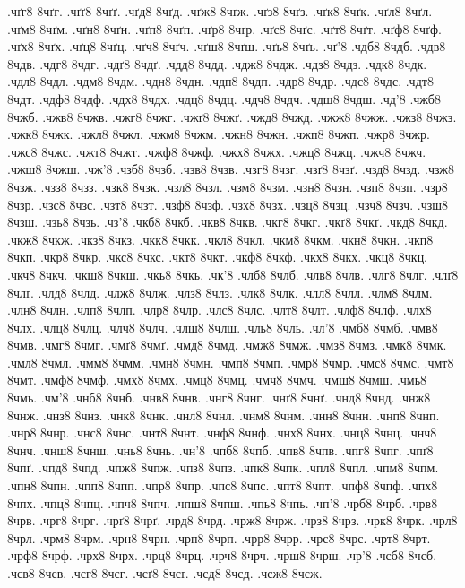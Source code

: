 {.чґг8 8чґг.
.чґґ8 8чґґ.
.чґд8 8чґд.
.чґж8 8чґж.
.чґз8 8чґз.
.чґк8 8чґк.
.чґл8 8чґл.
.чґм8 8чґм.
.чґн8 8чґн.
.чґп8 8чґп.
.чґр8 8чґр.
.чґс8 8чґс.
.чґт8 8чґт.
.чґф8 8чґф.
.чґх8 8чґх.
.чґц8 8чґц.
.чґч8 8чґч.
.чґш8 8чґш.
.чґь8 8чґь.
.чґ'8
.чдб8 8чдб.
.чдв8 8чдв.
.чдг8 8чдг.
.чдґ8 8чдґ.
.чдд8 8чдд.
.чдж8 8чдж.
.чдз8 8чдз.
.чдк8 8чдк.
.чдл8 8чдл.
.чдм8 8чдм.
.чдн8 8чдн.
.чдп8 8чдп.
.чдр8 8чдр.
.чдс8 8чдс.
.чдт8 8чдт.
.чдф8 8чдф.
.чдх8 8чдх.
.чдц8 8чдц.
.чдч8 8чдч.
.чдш8 8чдш.
.чд'8
.чжб8 8чжб.
.чжв8 8чжв.
.чжг8 8чжг.
.чжґ8 8чжґ.
.чжд8 8чжд.
.чжж8 8чжж.
.чжз8 8чжз.
.чжк8 8чжк.
.чжл8 8чжл.
.чжм8 8чжм.
.чжн8 8чжн.
.чжп8 8чжп.
.чжр8 8чжр.
.чжс8 8чжс.
.чжт8 8чжт.
.чжф8 8чжф.
.чжх8 8чжх.
.чжц8 8чжц.
.чжч8 8чжч.
.чжш8 8чжш.
.чж'8
.чзб8 8чзб.
.чзв8 8чзв.
.чзг8 8чзг.
.чзґ8 8чзґ.
.чзд8 8чзд.
.чзж8 8чзж.
.чзз8 8чзз.
.чзк8 8чзк.
.чзл8 8чзл.
.чзм8 8чзм.
.чзн8 8чзн.
.чзп8 8чзп.
.чзр8 8чзр.
.чзс8 8чзс.
.чзт8 8чзт.
.чзф8 8чзф.
.чзх8 8чзх.
.чзц8 8чзц.
.чзч8 8чзч.
.чзш8 8чзш.
.чзь8 8чзь.
.чз'8
.чкб8 8чкб.
.чкв8 8чкв.
.чкг8 8чкг.
.чкґ8 8чкґ.
.чкд8 8чкд.
.чкж8 8чкж.
.чкз8 8чкз.
.чкк8 8чкк.
.чкл8 8чкл.
.чкм8 8чкм.
.чкн8 8чкн.
.чкп8 8чкп.
.чкр8 8чкр.
.чкс8 8чкс.
.чкт8 8чкт.
.чкф8 8чкф.
.чкх8 8чкх.
.чкц8 8чкц.
.чкч8 8чкч.
.чкш8 8чкш.
.чкь8 8чкь.
.чк'8
.члб8 8члб.
.члв8 8члв.
.члг8 8члг.
.члґ8 8члґ.
.члд8 8члд.
.члж8 8члж.
.члз8 8члз.
.члк8 8члк.
.члл8 8члл.
.члм8 8члм.
.члн8 8члн.
.члп8 8члп.
.члр8 8члр.
.члс8 8члс.
.члт8 8члт.
.члф8 8члф.
.члх8 8члх.
.члц8 8члц.
.члч8 8члч.
.члш8 8члш.
.чль8 8чль.
.чл'8
.чмб8 8чмб.
.чмв8 8чмв.
.чмг8 8чмг.
.чмґ8 8чмґ.
.чмд8 8чмд.
.чмж8 8чмж.
.чмз8 8чмз.
.чмк8 8чмк.
.чмл8 8чмл.
.чмм8 8чмм.
.чмн8 8чмн.
.чмп8 8чмп.
.чмр8 8чмр.
.чмс8 8чмс.
.чмт8 8чмт.
.чмф8 8чмф.
.чмх8 8чмх.
.чмц8 8чмц.
.чмч8 8чмч.
.чмш8 8чмш.
.чмь8 8чмь.
.чм'8
.чнб8 8чнб.
.чнв8 8чнв.
.чнг8 8чнг.
.чнґ8 8чнґ.
.чнд8 8чнд.
.чнж8 8чнж.
.чнз8 8чнз.
.чнк8 8чнк.
.чнл8 8чнл.
.чнм8 8чнм.
.чнн8 8чнн.
.чнп8 8чнп.
.чнр8 8чнр.
.чнс8 8чнс.
.чнт8 8чнт.
.чнф8 8чнф.
.чнх8 8чнх.
.чнц8 8чнц.
.чнч8 8чнч.
.чнш8 8чнш.
.чнь8 8чнь.
.чн'8
.чпб8 8чпб.
.чпв8 8чпв.
.чпг8 8чпг.
.чпґ8 8чпґ.
.чпд8 8чпд.
.чпж8 8чпж.
.чпз8 8чпз.
.чпк8 8чпк.
.чпл8 8чпл.
.чпм8 8чпм.
.чпн8 8чпн.
.чпп8 8чпп.
.чпр8 8чпр.
.чпс8 8чпс.
.чпт8 8чпт.
.чпф8 8чпф.
.чпх8 8чпх.
.чпц8 8чпц.
.чпч8 8чпч.
.чпш8 8чпш.
.чпь8 8чпь.
.чп'8
.чрб8 8чрб.
.чрв8 8чрв.
.чрг8 8чрг.
.чрґ8 8чрґ.
.чрд8 8чрд.
.чрж8 8чрж.
.чрз8 8чрз.
.чрк8 8чрк.
.чрл8 8чрл.
.чрм8 8чрм.
.чрн8 8чрн.
.чрп8 8чрп.
.чрр8 8чрр.
.чрс8 8чрс.
.чрт8 8чрт.
.чрф8 8чрф.
.чрх8 8чрх.
.чрц8 8чрц.
.чрч8 8чрч.
.чрш8 8чрш.
.чр'8
.чсб8 8чсб.
.чсв8 8чсв.
.чсг8 8чсг.
.чсґ8 8чсґ.
.чсд8 8чсд.
.чсж8 8чсж.
}

